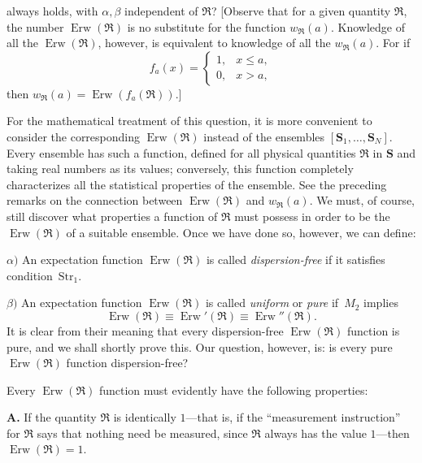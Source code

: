 \documentclass[fontsize=13pt,twoside,openany,headings=normal,parskip=false,bookmarkpackage=false,DIV=calc]{scrbook}
\begin{document}
always holds, with $\alpha,\beta$ independent of $\mathfrak R$? [Observe that for a given quantity $\mathfrak R$, the number $\operatorname{Erw}(\mathfrak R)$ is no substitute for the function $w_{\mathfrak R}(a)$. Knowledge of all the $\operatorname{Erw}(\mathfrak R)$, however, is equivalent to knowledge of all the $w_{\mathfrak R}(a)$. For if
\[
f_a(x)=\begin{cases}1,&x\leq a,\\0,&x>a,\end{cases}
\]
then $w_{\mathfrak R}(a)=\operatorname{Erw}(f_a(\mathfrak R))$.]

For the mathematical treatment of this question, it is more convenient to consider the corresponding $\operatorname{Erw}(\mathfrak R)$ instead of the ensembles $[\boldsymbol{S}_1,\ldots,\boldsymbol{S}_N]$. Every ensemble has such a function, defined for all physical quantities $\mathfrak R$ in $\boldsymbol{S}$ and taking real numbers as its values; conversely, this function completely characterizes all the statistical properties of the ensemble. See the preceding remarks on the connection between $\operatorname{Erw}(\mathfrak R)$ and $w_{\mathfrak R}(a)$. We must, of course, still discover what properties a function of $\mathfrak R$ must possess in order to be the $\operatorname{Erw}(\mathfrak R)$ of a suitable ensemble. Once we have done so, however, we can define:

\noindent{}$\alpha)$\label{def:IV.1.alpha} An expectation function $\operatorname{Erw}(\mathfrak R)$ is called \emph{dispersion-free} if it satisfies condition~\hyperref[eq:IV.1.Str1]{$\mathrm{Str}_1$}.

\noindent{}$\beta)$\label{def:IV.1.beta} An expectation function $\operatorname{Erw}(\mathfrak R)$ is called \emph{uniform} or \emph{pure} if~\hyperref[eq:IV.1.M2]{$M_2$} implies
\[
\operatorname{Erw}(\mathfrak R)\equiv\operatorname{Erw}'(\mathfrak R)
\equiv\operatorname{Erw}''(\mathfrak R).
\]
It is clear from their meaning that every dispersion-free $\operatorname{Erw}(\mathfrak R)$ function is pure, and we shall shortly prove this. Our question, however, is: is every pure $\operatorname{Erw}(\mathfrak R)$ function dispersion-free?

Every $\operatorname{Erw}(\mathfrak R)$ function must evidently have the following properties:

\noindent{}\textbf{A.}\label{cond:IV.1.A} If the quantity $\mathfrak R$ is identically $1$---that is, if the ``measurement instruction'' for $\mathfrak R$ says that nothing need be measured, since $\mathfrak R$ always has the value $1$---then $\operatorname{Erw}(\mathfrak R)=1$.
\end{document}
